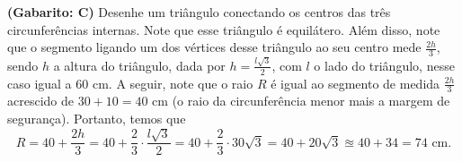 \documentclass[a4paper]{article}
\begin{document}
\par\textbf{(Gabarito: C)} Desenhe um triângulo conectando os centros das três circunferências internas. Note que esse triângulo é equilátero. Além disso, note que o segmento ligando um dos vértices desse triângulo ao seu centro mede $\displaystyle{\frac{2h}{3}}$, sendo $h$ a altura do triângulo, dada por $h = \frac{l\sqrt{3}}{2}$, com $l$ o lado do triângulo, nesse caso igual a $60$ cm. A seguir, note que o raio $R$ é igual ao segmento de medida $\displaystyle{\frac{2h}{3}}$ acrescido de $30+10 = 40$ cm (o raio da circunferência menor mais a margem de segurança). Portanto, temos que
\begin{equation*}
R = 40 + \frac{2h}{3} = 40 + \frac{2}{3}\cdot\frac{l\sqrt{3}}{2} = 40 + \frac{2}{3}\cdot 30\sqrt{3} = 40 + 20\sqrt{3} \approxeq 40 + 34 = 74\text{ cm}.
\end{equation*}
\end{document}
